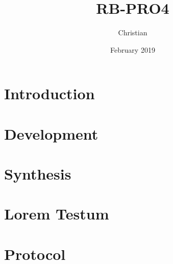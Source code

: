 \documentclass{report}
\title{RB-PRO4}
\author{Christian}
\date{February 2019}
\begin{document}

\maketitle

\begin{abstract}

\end{abstract}

\tableofcontents

\newpage
{}

\chapter{Introduction}


\chapter{Development}


\chapter{Synthesis}


\chapter{Lorem Testum}


\chapter{Protocol}


\newpage
\printbibliography
\end{document}

